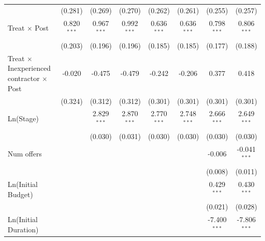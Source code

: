 \documentclass[
]{article}
\begin{document}
\begin{tabular}{lccccccc}
                                                           & (0.281)        & (0.269)        & (0.270)        & (0.262)       & (0.261)        & (0.255)        & (0.257)\\   
   Treat $\times$ Post                                     & 0.820$^{***}$  & 0.967$^{***}$  & 0.992$^{***}$  & 0.636$^{***}$ & 0.636$^{***}$  & 0.798$^{***}$  & 0.806$^{***}$\\   
                                                           & (0.203)        & (0.196)        & (0.196)        & (0.185)       & (0.185)        & (0.177)        & (0.188)\\   
   Treat $\times$ Inexperienced contractor $\times$ Post   & -0.020         & -0.475         & -0.479         & -0.242        & -0.206         & 0.377          & 0.418\\   
                                                           & (0.324)        & (0.312)        & (0.312)        & (0.301)       & (0.301)        & (0.301)        & (0.301)\\   
   Ln(Stage)                                               &                & 2.829$^{***}$  & 2.870$^{***}$  & 2.770$^{***}$ & 2.748$^{***}$  & 2.666$^{***}$  & 2.649$^{***}$\\   
                                                           &                & (0.030)        & (0.031)        & (0.030)       & (0.030)        & (0.030)        & (0.030)\\   
   Num offers                                              &                &                &                &               &                & -0.006         & -0.041$^{***}$\\   
                                                           &                &                &                &               &                & (0.008)        & (0.011)\\   
   Ln(Initial Budget)                                      &                &                &                &               &                & 0.429$^{***}$  & 0.430$^{***}$\\   
                                                           &                &                &                &               &                & (0.021)        & (0.028)\\   
   Ln(Initial Duration)                                    &                &                &                &               &                & -7.400$^{***}$ & -7.806$^{***}$\\   

\end{tabular}
\end{document}
